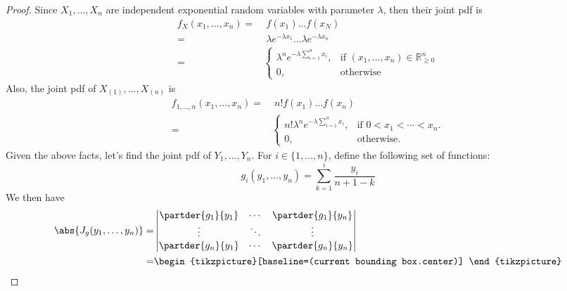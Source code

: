 \documentclass[hwnumber=3,studentnumber=20053722]{mthe353answer}
\begin{document}
  \begin{questions}
    \setcounter{question}{1}
    \question{}
    \begin{solution}
      \begin{proof}
        Since \(X_1, \dots, X_n\) are independent exponential random variables
        with parameter \(\lambda\), then their joint pdf is
        \begin{align*}
          f_X(x_1, \dots, x_n) =&\; f(x_1) \dots f(x_N)\\
          =&\; \lambda e^{-\lambda x_1} \dots \lambda e^{-\lambda x_n}\\
          =&
          \begin{cases}
            \lambda^n e^{-\lambda \sum_{i=1}^n x_i}, & \text{if } (x_1, \dots, x_n) \in \mathbb{R}_{\ge 0}^n\\
            0, & \text{otherwise}
          \end{cases}
        \end{align*}
        Also, the joint pdf of \(X_{(1)}, \dots, X_{(n)}\) is
        \begin{align*}
          f_{1, \dots, n}(x_1, \dots, x_n) =&\; n!f(x_1) \dots f(x_n)\\
          =&
          \begin{cases}
            n!\lambda^n e^{-\lambda \sum_{i=1}^n x_i}, & \text{if } 0 < x_1 < \cdots < x_n.\\
            0, & \text{otherwise.}
          \end{cases}
        \end{align*}
        Given the above facts, let's find the joint pdf of \(Y_1, \dots, Y_n\). For \(i \in \{1, \dots, n\}\),
        define the following set of functions:
        \begin{equation*}
          g_i(y_1, \dots, y_n) = \sum_{k = 1}^i \frac{y_i}{n+1-k}
        \end{equation*}
        We then have
        \begin{align*}
          \abs{J_g(y_1, \dots, y_n)} =&
          \begin{vmatrix}
            \partder{g_1}{y_1} & \cdots & \partder{g_1}{y_n}\\
            \vdots & \ddots & \vdots\\
            \partder{g_n}{y_1} & \cdots & \partder{g_n}{y_n}\\
          \end{vmatrix}\\
          =&
          \begin{tikzpicture}[baseline=(current bounding box.center)]

\end{tikzpicture}
\end{align*}
\end{proof}
\end{solution}
\end{questions}
\end{document}
